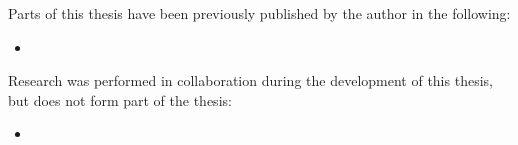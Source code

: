 
\begin{thesisdeclaration}

\noindent Parts of this thesis have been previously published by the author in the following:
\begin{itemize}
\item[\citep{ref}] 

\end{itemize}

\noindent Research was performed in collaboration during the development of this thesis, but does not form part of the thesis:
\begin{itemize}
\item[\citep{ref2}] 
\end{itemize}

\end{thesisdeclaration}
